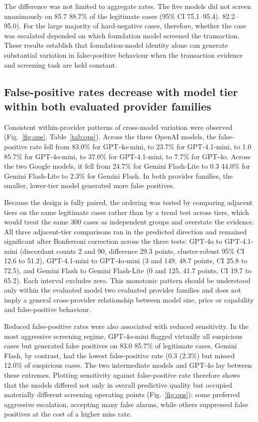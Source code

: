 \documentclass[pdflatex,sn-basic,Numbered]{sn-jnl}
\newcommand{\HLtext}[1]{\texthl{#1}}
\newcommand{\HLdel}[1]{\textcolor{HLink}{\sout{#1}}}
\renewcommand{\HLtext}[1]{#1}\renewcommand{\HLdel}[1]{#1}%
\begin{document}
The difference was not limited to aggregate rates. The five models did not screen unanimously on \HLdel{85.7} \HLtext{88.7}\% of the legitimate cases (95\% CI \HLdel{75.1--95.4).} \HLtext{82.2--95.0).} For the large majority of hard-negative cases, therefore, whether the case was escalated depended on which foundation model screened the transaction. These results establish that foundation-model identity alone can generate substantial variation in false-positive behaviour when the transaction evidence and screening task are held constant.

\subsection{False-positive rates decrease with model tier within both evaluated provider families}\label{sec:tier}

Consistent within-provider patterns of cross-model variation were observed (Fig.~\ref{fig:ops}\HLtext{,} Table~\ref{tab:ops}). Across the three OpenAI models, the false-positive rate fell from \HLdel{83.0\% for GPT-4o-mini, to 23.7\% for GPT-4.1-mini, to 1.0} \HLtext{85.7}\% \HLtext{for GPT-4o-mini, to 37.0}\% \HLtext{for GPT-4.1-mini, to 7.7}\% for GPT-4o. Across the two Google models, it fell from \HLdel{24.7\% for Gemini Flash-Lite to 0.3} \HLtext{44.0}\% \HLtext{for Gemini Flash-Lite to 2.3}\% for Gemini Flash. In both provider families, the smaller, lower-tier model generated more false positives.

\HLtext{Because the design is fully paired, the ordering was tested by comparing adjacent tiers on the same legitimate cases rather than by a trend test across tiers, which would treat the same 300 cases as independent groups and overstate the evidence. All three adjacent-tier comparisons ran in the predicted direction and remained significant after Bonferroni correction across the three tests: GPT-4o to GPT-4.1-mini (discordant counts 2 and 90, difference 29.3 points, cluster-robust 95}\% \HLtext{CI 12.6 to 51.2), GPT-4.1-mini to GPT-4o-mini (3 and 149, 48.7 points, CI 25.8 to 72.5), and Gemini Flash to Gemini Flash-Lite (0 and 125, 41.7 points, CI 19.7 to 65.2). Each interval excludes zero.} This monotonic pattern should be understood only within the \HLdel{evaluated model} \HLtext{two evaluated provider} families and does not imply a general cross-provider relationship between model size, price or capability and false-positive behaviour.

Reduced false-positive rates were also associated with reduced sensitivity. In the most aggressive screening regime, GPT-4o-mini flagged virtually all suspicious cases but generated false positives on \HLdel{83.0} \HLtext{85.7}\% of legitimate cases. Gemini Flash, by contrast, had the lowest false-positive rate \HLdel{(0.3} \HLtext{(2.3}\%) but missed 12.0\% of suspicious cases. The two intermediate models and GPT-4o lay between these extremes. Plotting sensitivity against false-positive rate therefore shows that the models differed not only in overall predictive quality but occupied materially different screening operating points (Fig.~\ref{fig:ops}): some preferred aggressive escalation, accepting many false alarms, while others suppressed false positives at the cost of a higher miss rate.
\end{document}
